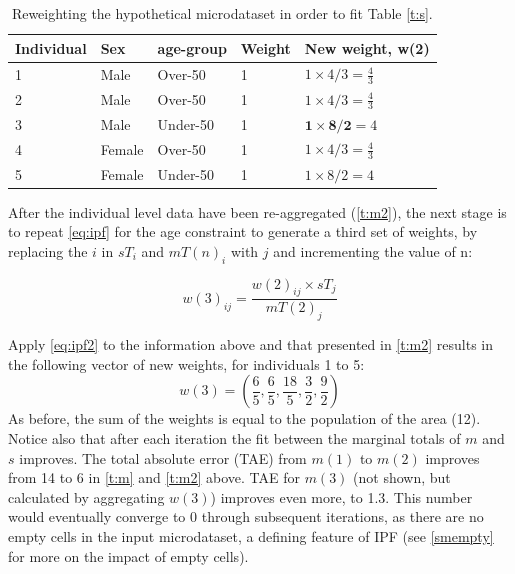 \documentclass[a4paper,10pt]{article}
\begin{document}
\begin{table}[htbp]
\centering
\caption{Reweighting the hypothetical microdataset in order to fit
Table \ref{t:s}.}
\begin{tabular}{lllll}
\toprule
{Individual} & {Sex} & {age-group} & {Weight} &
{New weight, w(2)} \\ \midrule
1 & Male & Over-50 & 1 & $1 \times 4/3 = \frac{4}{3}$ \\
2 & Male & Over-50 & 1 & $1 \times 4/3 = \frac{4}{3}$ \\
3 & Male & Under-50 & 1 & $\textbf{1} \times
\textbf{8}/\textbf{2} = 4$ \\
4 & Female & Over-50 & 1 & $1 \times 4/3 = \frac{4}{3}$ \\
5 & Female & Under-50 & 1 & $1 \times 8/2 = 4$ \\
\bottomrule
\end{tabular}
\label{t:new-weights}
\end{table}

After the individual level data have been re-aggregated (\cref{t:m2}),
the next stage is to repeat \cref{eq:ipf} for the age constraint to generate a
third set of weights, by replacing
the $i$ in $sT_{i}$ and $mT(n)_{i}$ with $j$ and incrementing the value of n:

\begin{equation}
w(3)_{ij} = \frac{w(2)_{ij} \times sT_{j}}{mT(2)_{j}}
\label{eq:ipf2}
\end{equation}

Apply \cref{eq:ipf2} to the information above and that presented in \cref{t:m2}
results in the following vector of new weights, for individuals 1 to 5:
\begin{equation}
  w(3) = (\frac{6}{5}, \frac{6}{5}, \frac{18}{5}, \frac{3}{2}, \frac{9}{2})
\end{equation}
As before, the sum of the weights is equal to the population of the area (12).
Notice also that after each iteration the fit between the marginal
totals of $m$ and $s$
improves. The total absolute error (TAE)
from $m(1)$ to $m(2)$ improves from
14 to 6 in \cref{t:m} and \cref{t:m2} above. TAE for $m(3)$ (not shown,
but calculated by aggregating $w(3)$) improves even more, to 1.3.
This number would eventually converge to 0 through subsequent
iterations, as there are no empty cells in the input microdataset,
a defining feature of IPF (see \cref{smempty} for more on the impact of empty cells).
\end{document}

